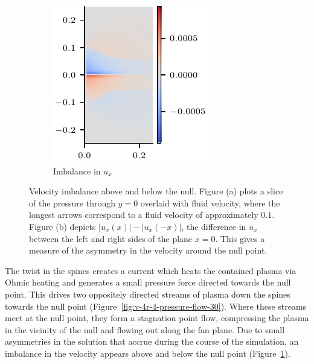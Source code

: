 \begin{figure}[t]
\begin{subfigure}{0.32\textwidth}
      \includegraphics[width=\linewidth]{v-4r-4-vx-imbalance-30.pdf}
      \caption{Imbalance in $u_x$}
      \label{fig:v-4r-4-vx-imbalance-30}
    \end{subfigure}
\caption{Velocity imbalance above and below the null. Figure (a) plots a slice of the pressure through $y=0$ overlaid with fluid velocity, where the longest arrows correspond to a fluid velocity of approximately $0.1$. Figure (b) depicts $|u_x(x)| - |u_x(-x)|$, the difference in $u_x$ between the left and right sides of the plane $x=0$. This gives a measure of the asymmetry in the velocity around the null point.}
\label{fig:imbalance_in_velocity}
\end{figure}

The twist in the spines creates a current which heats the contained plasma via Ohmic heating and generates a small pressure force directed towards the null point. This drives two oppositely directed streams of plasma down the spines towards the null point (Figure~\ref{fig:v-4r-4-pressure-flow-30}). Where these streams meet at the null point, they form a stagnation point flow, compressing the plasma in the vicinity of the null and flowing out along the fan plane. Due to small asymmetries in the solution that accrue during the course of the simulation, an imbalance in the velocity appears above and below the null point (Figure~\ref{fig:v-4r-4-vx-imbalance-30}). 


